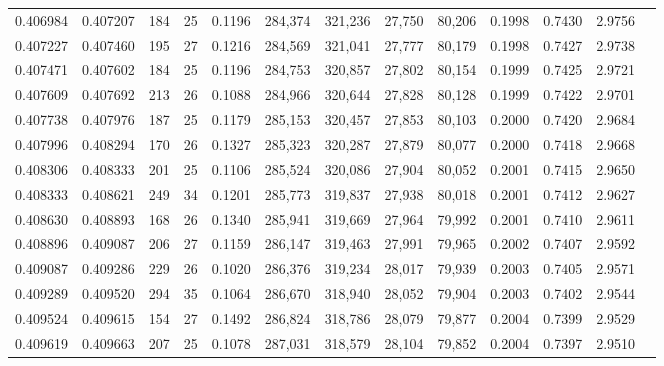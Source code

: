 \begin{tabular}{rrrrrrrrrrrrr}
0.406984 & 0.407207 &    184 &    25 &                                     0.1196 & 284,374 & 321,236 &  27,750 &  80,206 & 0.1998 & 0.7430 & 2.9756 \\
0.407227 & 0.407460 &    195 &    27 &                                     0.1216 & 284,569 & 321,041 &  27,777 &  80,179 & 0.1998 & 0.7427 & 2.9738 \\
0.407471 & 0.407602 &    184 &    25 &                                     0.1196 & 284,753 & 320,857 &  27,802 &  80,154 & 0.1999 & 0.7425 & 2.9721 \\
0.407609 & 0.407692 &    213 &    26 &                                     0.1088 & 284,966 & 320,644 &  27,828 &  80,128 & 0.1999 & 0.7422 & 2.9701 \\
0.407738 & 0.407976 &    187 &    25 &                                     0.1179 & 285,153 & 320,457 &  27,853 &  80,103 & 0.2000 & 0.7420 & 2.9684 \\
0.407996 & 0.408294 &    170 &    26 &                                     0.1327 & 285,323 & 320,287 &  27,879 &  80,077 & 0.2000 & 0.7418 & 2.9668 \\
0.408306 & 0.408333 &    201 &    25 &                                     0.1106 & 285,524 & 320,086 &  27,904 &  80,052 & 0.2001 & 0.7415 & 2.9650 \\
0.408333 & 0.408621 &    249 &    34 &                                     0.1201 & 285,773 & 319,837 &  27,938 &  80,018 & 0.2001 & 0.7412 & 2.9627 \\
0.408630 & 0.408893 &    168 &    26 &                                     0.1340 & 285,941 & 319,669 &  27,964 &  79,992 & 0.2001 & 0.7410 & 2.9611 \\
0.408896 & 0.409087 &    206 &    27 &                                     0.1159 & 286,147 & 319,463 &  27,991 &  79,965 & 0.2002 & 0.7407 & 2.9592 \\
0.409087 & 0.409286 &    229 &    26 &                                     0.1020 & 286,376 & 319,234 &  28,017 &  79,939 & 0.2003 & 0.7405 & 2.9571 \\
0.409289 & 0.409520 &    294 &    35 &                                     0.1064 & 286,670 & 318,940 &  28,052 &  79,904 & 0.2003 & 0.7402 & 2.9544 \\
0.409524 & 0.409615 &    154 &    27 &                                     0.1492 & 286,824 & 318,786 &  28,079 &  79,877 & 0.2004 & 0.7399 & 2.9529 \\
0.409619 & 0.409663 &    207 &    25 &                                     0.1078 & 287,031 & 318,579 &  28,104 &  79,852 & 0.2004 & 0.7397 & 2.9510 \\

\end{tabular}
